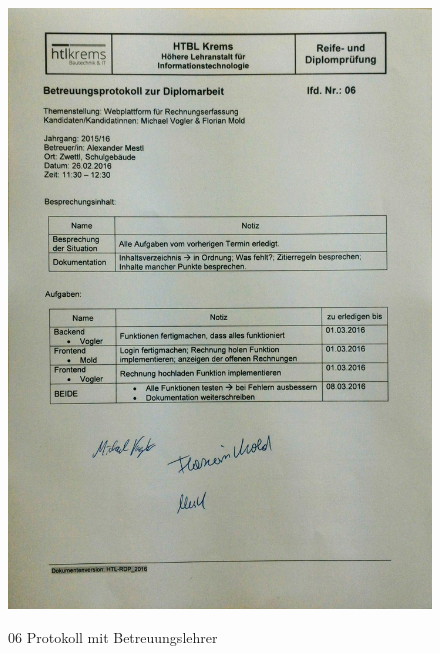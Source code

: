 \begin{figure}[!h]
    \centering
    \includegraphics[width=13cm]{figures/Mestl_06.jpg}
    \label{fig:06_Protokoll_Betreuungslehrer}
    \caption{06 Protokoll mit Betreuungslehrer}
\end{figure}
\newpage


